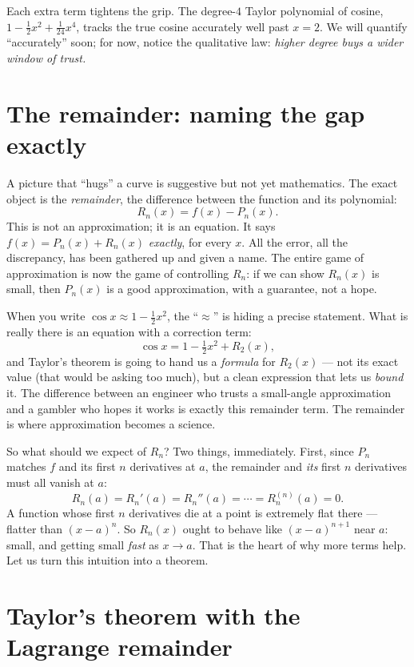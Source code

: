 Each extra term tightens the grip. The degree-$4$ Taylor polynomial of cosine,
$1 - \tfrac12 x^2 + \tfrac{1}{24}x^4$, tracks the true cosine accurately well past
$x=2$. We will quantify ``accurately'' soon; for now, notice the qualitative law:
\emph{higher degree buys a wider window of trust.}

\section{The remainder: naming the gap exactly}

A picture that ``hugs'' a curve is suggestive but not yet mathematics. The exact
object is the \emph{remainder}, the difference between the function and its
polynomial:
\[
  R_n(x) = f(x) - P_n(x).
\]
This is not an approximation; it is an equation. It says $f(x) = P_n(x) + R_n(x)$
\emph{exactly}, for every $x$. All the error, all the discrepancy, has been gathered
up and given a name. The entire game of approximation is now the game of controlling
$R_n$: if we can show $R_n(x)$ is small, then $P_n(x)$ is a good approximation, with
a guarantee, not a hope.

\begin{happeningbox}
When you write $\cos x \approx 1 - \tfrac12 x^2$, the ``$\approx$'' is hiding a
precise statement. What is really there is an equation with a correction term:
\[
  \cos x = 1 - \tfrac12 x^2 + R_2(x),
\]
and Taylor's theorem is going to hand us a \emph{formula} for $R_2(x)$ --- not its
exact value (that would be asking too much), but a clean expression that lets us
\emph{bound} it. The difference between an engineer who trusts a small-angle
approximation and a gambler who hopes it works is exactly this remainder term. The
remainder is where approximation becomes a science.
\end{happeningbox}

So what should we expect of $R_n$? Two things, immediately. First, since $P_n$
matches $f$ and its first $n$ derivatives at $a$, the remainder and \emph{its} first
$n$ derivatives must all vanish at $a$:
\[
  R_n(a) = R_n'(a) = R_n''(a) = \cdots = R_n^{(n)}(a) = 0.
\]
A function whose first $n$ derivatives die at a point is extremely flat there ---
flatter than $(x-a)^n$. So $R_n(x)$ ought to behave like $(x-a)^{n+1}$ near $a$:
small, and getting small \emph{fast} as $x \to a$. That is the heart of why more
terms help. Let us turn this intuition into a theorem.

\section{Taylor's theorem with the Lagrange remainder}

